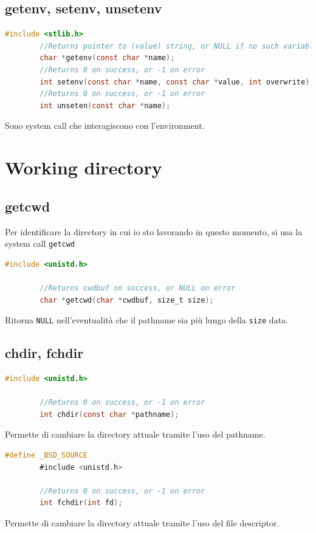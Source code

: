 \documentclass[a4paper, 12pt]{book}
\begin{document}
    \subsection{getenv, setenv, unsetenv}

    \begin{lstlisting}[language=C]
        #include <stlib.h>
        //Returns pointer to (value) string, or NULL if no such variable exists
        char *getenv(const char *name);
        //Returns 0 on success, or -1 on error
        int setenv(const char *name, const char *value, int overwrite);
        //Returns 0 on success, or -1 on error
        int unseten(const char *name);
    \end{lstlisting} 
    Sono system call che interagiscono con l'environment.

    \section{Working directory}

    \subsection{getcwd}

    Per identificare la directory in cui io sto lavorando
    in questo momento, si usa la system call \verb|getcwd|
    \begin{lstlisting}[language=C]
        #include <unistd.h>

        //Returns cwdbuf on success, or NULL on error
        char *getcwd(char *cwdbuf, size_t size);
    \end{lstlisting} 
    Ritorna \verb|NULL| nell'eventualità che il pathname 
    sia più lungo della \verb|size| data.

    \subsection{chdir, fchdir}

    \begin{lstlisting}[language=C]
        #include <unistd.h>

        //Returns 0 on success, or -1 on error
        int chdir(const char *pathname);
    \end{lstlisting} 
    Permette di cambiare la directory attuale tramite 
    l'uso del pathname.

    \begin{lstlisting}[language=C]
        #define _BSD_SOURCE
        #include <unistd.h>

        //Returns 0 on success, or -1 on error
        int fchdir(int fd);
    \end{lstlisting} 
    Permette di cambiare la directory attuale tramite 
    l'uso del file descriptor.
\end{document}
